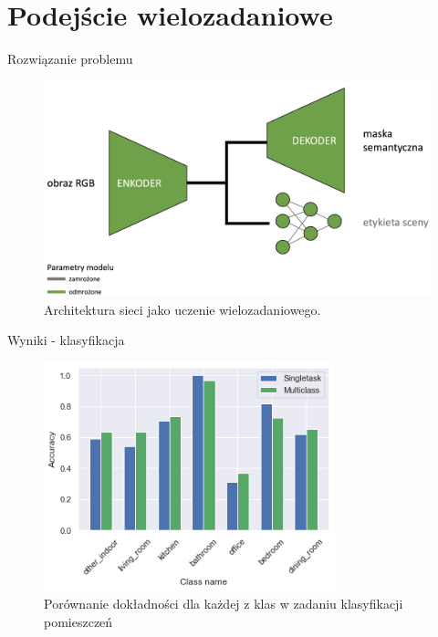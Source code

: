 \documentclass[10pt]{beamer}
\begin{document}
\section*{Podejście wielozadaniowe}
\begin{frame}{Rozwiązanie problemu}
    \begin{figure}
        \includegraphics[width=\textwidth]{images/arch:full.png}
        \caption{Architektura sieci jako uczenie wielozadaniowego.}
    \end{figure}
\end{frame}
    
\begin{frame}{Wyniki - klasyfikacja}
    \begin{figure}
        \includegraphics[width=0.75\textwidth]{images/scene_comp.png}
        \caption{Porównanie dokładności dla każdej z klas w zadaniu klasyfikacji pomieszczeń}
    \end{figure}
\end{frame}    
    
\end{document}

